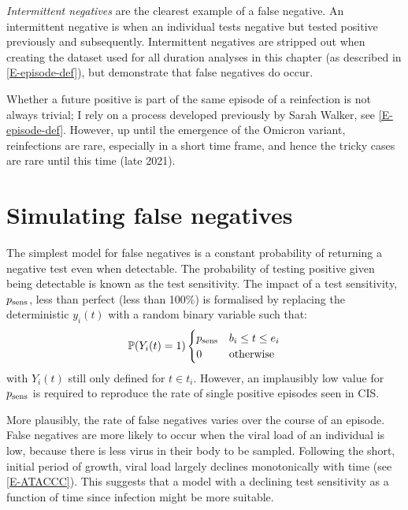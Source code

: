 \documentclass[thesis.tex]{subfiles}
\begin{document}

\emph{Intermittent negatives} are the clearest example of a false negative.
An intermittent negative is when an individual tests negative but tested positive previously and subsequently.
Intermittent negatives are stripped out when creating the dataset used for all duration analyses in this chapter (as described in \cref{E-episode-def}), but demonstrate that false negatives do occur.

Whether a future positive is part of the same episode of a reinfection is not always trivial; I rely on a process developed previously by Sarah Walker, see \cref{E-episode-def}.
However, up until the emergence of the Omicron variant, reinfections are rare, especially in a short time frame, and hence the tricky cases are rare until this time (late 2021).

\section{Simulating false negatives} \label{imperf-test:sec:simulate}

The simplest model for false negatives is a constant probability of returning a negative test even when detectable.
The probability of testing positive given being detectable is known as the test sensitivity.
The impact of a test sensitivity, $p_\text{sens}$, less than perfect (\ie less than 100\%) is formalised by replacing the deterministic $y_i(t)$ with a random binary variable such that:
\begin{equation}
  \operatorname{\mathbb{P}}(Y_i(t) = 1) \begin{cases}
      p_\text{sens} &b_i \leq t \leq e_i \\
      0 &\text{otherwise}
  \end{cases} 
\end{equation}
with $Y_i(t)$ still only defined for $t \in t_i$.
However, an implausibly low value for $p_\text{sens}$ is required to reproduce the rate of single positive episodes seen in CIS.

More plausibly, the rate of false negatives varies over the course of an episode.
False negatives are more likely to occur when the viral load of an individual is low, because there is less virus in their body to be sampled.
Following the short, initial period of growth, viral load largely declines monotonically with time (see \cref{E-ATACCC}).
This suggests that a model with a declining test sensitivity as a function of time since infection might be more suitable.
\end{document}
